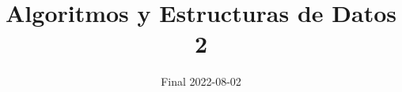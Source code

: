 

\title{Algoritmos y Estructuras de Datos 2}
\author{Final 2022-08-02}
\date{}



\maketitle







